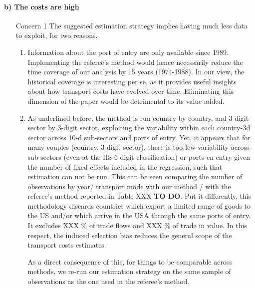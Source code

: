 \documentclass[a4paper,12pt]{article}
\begin{document}
\paragraph{b) The costs are high}
\begin{itemize}
\item[Concern 1] The suggested estimation strategy implies having much less data to exploit, for two reasons.
\begin{enumerate}
\item Information about the port of entry are only available since 1989. Implementing the referee's method would hence necessarily reduce the time coverage of our analysis by 15 years (1974-1988). In our view, the historical coverage is interesting per se, as it provides useful insights about how transport costs have evolved over time. Eliminating this dimension of the paper would be detrimental to its value-added.
\item As underlined before, the method is run country by country, and 3-digit sector by 3-digit sector, exploiting the variability within each country-3d sector across 10-d sub-sectors and ports of entry. Yet, it appears that for many couples (country, 3-digit sector), there is too few variability across sub-sectors (even at the HS-6 digit classification) or ports en entry given the number of fixed effects included in the regression, such that estimation can not be run. This can be seen comparing the number of observations by year/ transport mode with our method / with the referee's method reported in Table XXX \textbf{TO DO}. Put it differently, this methodology discards countries which export a limited range of goods to the US and/or which arrive in the USA through the same ports of entry. It excludes XXX \% of trade flows and XXX \% of trade in value. In this respect, the induced selection bias reduces the general scope of the transport costs estimates.


    As a direct consequence of this, for things to be comparable across methods, we re-run our estimation strategy on the same sample of observations as the one used in the referee's method.


\end{enumerate}
\end{itemize}
\end{document}
